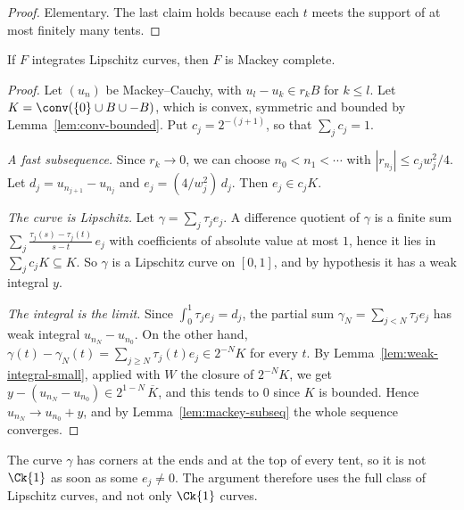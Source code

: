 \begin{proof}
  \leanok
  Elementary. The last claim holds because each $t$ meets the support of at most finitely many
  tents.
\end{proof}

\begin{theorem}
  \label{thm:lipschitz-to-mackey}
  \leanok
  If $F$ integrates Lipschitz curves, then $F$ is Mackey complete.
\end{theorem}

\begin{proof}
  \leanok
  Let $(u_n)$ be Mackey--Cauchy, with $u_l - u_k \in r_k B$ for $k \leq l$. Let
  $K = \conv(\{0\} \cup B \cup -B)$, which is convex, symmetric and bounded by
  Lemma~\ref{lem:conv-bounded}. Put $c_j = 2^{-(j+1)}$, so that $\sum_j c_j = 1$.

  \emph{A fast subsequence.} Since $r_k \to 0$, we can choose $n_0 < n_1 < \cdots$ with
  $|r_{n_j}| \leq c_j w_j^2 / 4$. Let $d_j = u_{n_{j+1}} - u_{n_j}$ and
  $e_j = (4 / w_j^2)\, d_j$. Then $e_j \in c_j K$.

  \emph{The curve is Lipschitz.} Let $\gamma = \sum_j \tau_j e_j$. A difference quotient of
  $\gamma$ is a finite sum $\sum_j \frac{\tau_j(s) - \tau_j(t)}{s - t}\, e_j$ with coefficients
  of absolute value at most $1$, hence it lies in $\sum_j c_j K \subseteq K$. So $\gamma$ is a
  Lipschitz curve on $[0, 1]$, and by hypothesis it has a weak integral $y$.

  \emph{The integral is the limit.} Since $\int_0^1 \tau_j e_j = d_j$, the partial sum
  $\gamma_N = \sum_{j < N} \tau_j e_j$ has weak integral $u_{n_N} - u_{n_0}$. On the other hand,
  $\gamma(t) - \gamma_N(t) = \sum_{j \geq N} \tau_j(t) e_j \in 2^{-N} K$ for every $t$. By
  Lemma~\ref{lem:weak-integral-small}, applied with $W$ the closure of $2^{-N} K$, we get
  $y - (u_{n_N} - u_{n_0}) \in 2^{1-N}\, \overline{K}$, and this tends to $0$ since $K$ is
  bounded. Hence $u_{n_N} \to u_{n_0} + y$, and by Lemma~\ref{lem:mackey-subseq} the whole
  sequence converges.
\end{proof}

\begin{remark}
  The curve $\gamma$ has corners at the ends and at the top of every tent, so it is not
  $\Ck{1}$ as soon as some $e_j \neq 0$. The argument therefore uses the full class of Lipschitz
  curves, and not only $\Ck{1}$ curves.
\end{remark}

